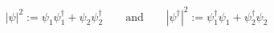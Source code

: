 \begin{equation}
 |\psi|^2:=\psi_1\psi_1^\dagger+\psi_2\psi_2^\dagger
 \qquad\text{and}\qquad
 |\psi^\dagger|^2:=\psi_1^\dagger\psi_1+\psi_2^\dagger\psi_2
\end{equation}


